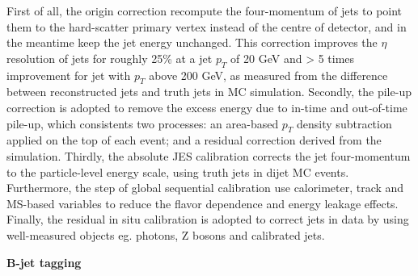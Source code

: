 First of all, the origin correction recompute the four-momentum of jets to point them to the hard-scatter primary vertex instead of the centre of detector, and in the meantime keep the jet energy unchanged.
This correction improves the $\eta$ resolution of jets for roughly 25\% at a jet $p_{T}$ of 20 GeV and > 5 times improvement for jet with $p_{T}$ above 200 GeV, 
as measured from the difference between reconstructed jets and truth jets in MC simulation.
Secondly, the pile-up correction is adopted to remove the excess energy due to in-time and out-of-time pile-up,
which consistents two processes: an area-based $p_{T}$ density subtraction applied on the top of each event; and a residual correction derived from the simulation.
Thirdly, the absolute JES calibration corrects the jet four-momentum to the particle-level energy scale, using truth jets in dijet MC events.
Furthermore, the step of global sequential calibration use calorimeter, track and MS-based variables to reduce the flavor dependence and energy leakage effects.
Finally, the residual in situ calibration is adopted to correct jets in data by using well-measured objects eg. photons, Z bosons and calibrated jets.

\textbf{B-jet tagging}

